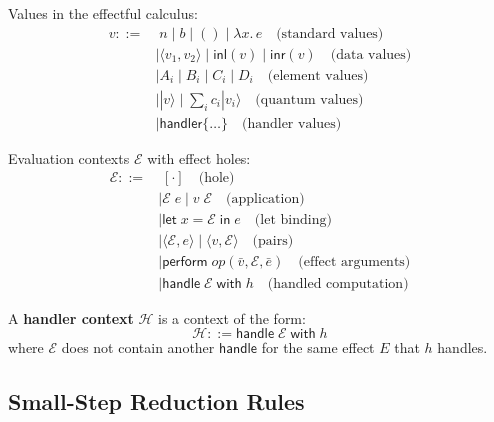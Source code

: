 \begin{definition}
\label{def:values-extended}
Values in the effectful calculus:
\begin{align}
v ::=&\; n \mid b \mid () \mid \lambda x.\, e \quad \text{(standard values)} \\
    &\mid \langle v_1, v_2 \rangle \mid \mathsf{inl}(v) \mid \mathsf{inr}(v) \quad \text{(data values)} \\
    &\mid A_i \mid B_i \mid C_i \mid D_i \quad \text{(element values)} \\
    &\mid |v\rangle \mid \sum_i c_i |v_i\rangle \quad \text{(quantum values)} \\
    &\mid \mathsf{handler}\{\ldots\} \quad \text{(handler values)}
\end{align}
\end{definition}

\begin{definition}
\label{def:eval-contexts}
Evaluation contexts $\mathcal{E}$ with effect holes:
\begin{align}
\mathcal{E} ::=&\; [\cdot] \quad \text{(hole)} \\
    &\mid \mathcal{E}\; e \mid v\; \mathcal{E} \quad \text{(application)} \\
    &\mid \mathsf{let}\; x = \mathcal{E}\; \mathsf{in}\; e \quad \text{(let binding)} \\
    &\mid \langle \mathcal{E}, e \rangle \mid \langle v, \mathcal{E} \rangle \quad \text{(pairs)} \\
    &\mid \mathsf{perform}\; \mathit{op}(\bar{v}, \mathcal{E}, \bar{e}) \quad \text{(effect arguments)} \\
    &\mid \mathsf{handle}\; \mathcal{E}\; \mathsf{with}\; h \quad \text{(handled computation)}
\end{align}
\end{definition}

\begin{definition}
\label{def:handler-contexts}
A \textbf{handler context} $\mathcal{H}$ is a context of the form:
\[
\mathcal{H} ::= \mathsf{handle}\; \mathcal{E}\; \mathsf{with}\; h
\]
where $\mathcal{E}$ does not contain another $\mathsf{handle}$ for the same effect $E$ that $h$ handles.
\end{definition}

\subsection{Small-Step Reduction Rules}
\label{subsec:small-step-rules}

